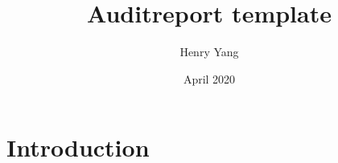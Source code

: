 \documentclass{article}
\title{Auditreport template}
\author{Henry Yang}
\date{April 2020}
\begin{document}
\maketitle

\section{Introduction}
\end{document}
